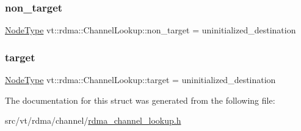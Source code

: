 \subsubsection{\texorpdfstring{non\+\_\+target}{non\_target}}
{\footnotesize\ttfamily \hyperlink{namespacevt_a866da9d0efc19c0a1ce79e9e492f47e2}{Node\+Type} vt\+::rdma\+::\+Channel\+Lookup\+::non\+\_\+target = uninitialized\+\_\+destination}

\mbox{\label{structvt_1_1rdma_1_1_channel_lookup_a5fc6e66edbe73653e261246202d22b97}} 
\subsubsection{\texorpdfstring{target}{target}}
{\footnotesize\ttfamily \hyperlink{namespacevt_a866da9d0efc19c0a1ce79e9e492f47e2}{Node\+Type} vt\+::rdma\+::\+Channel\+Lookup\+::target = uninitialized\+\_\+destination}



The documentation for this struct was generated from the following file\+:\begin{DoxyCompactItemize}
\item 
src/vt/rdma/channel/\hyperlink{rdma__channel__lookup_8h}{rdma\+\_\+channel\+\_\+lookup.\+h}\end{DoxyCompactItemize}
